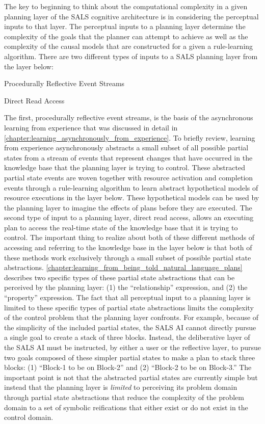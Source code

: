 The key to beginning to think about the computational complexity in a
given planning layer of the SALS cognitive architecture is in
considering the perceptual inputs to that layer.  The perceptual
inputs to a planning layer determine the complexity of the goals that
the planner can attempt to achieve as well as the complexity of the
causal models that are constructed for a given a rule-learning
algorithm.  There are two different types of inputs to a SALS planning
layer from the layer below:
\begin{packed_enumerate}
\item{Procedurally Reflective Event Streams}
\item{Direct Read Access}
\end{packed_enumerate}
The first, procedurally reflective event streams, is the basis of the
asynchronous learning from experience that was discussed in detail in
{\mbox{\autoref{chapter:learning_asynchronously_from_experience}}}.
To briefly review, learning from experience asynchronously abstracts a
small subset of all possible partial states from a stream of events
that represent changes that have occurred in the knowledge base that
the planning layer is trying to control.  These abstracted partial
state events are woven together with resource activation and
completion events through a rule-learning algorithm to learn abstract
hypothetical models of resource executions in the layer below.  These
hypothetical models can be used by the planning layer to imagine the
effects of plans before they are executed.  The second type of input
to a planning layer, direct read access, allows an executing plan to
access the real-time state of the knowledge base that it is trying to
control.  The important thing to realize about both of these different
methods of accessing and referring to the knowledge base in the layer
below is that both of these methods work exclusively through a small
subset of possible partial state abstractions.
{\mbox{\autoref{chapter:learning_from_being_told_natural_language_plans}}}
describes two specific types of these partial state abstractions that
can be perceived by the planning layer: (1) the ``relationship''
expression, and (2) the ``property'' expression.  The fact that all
perceptual input to a planning layer is limited to these specific
types of partial state abstractions limits the complexity of the
control problem that the planning layer confronts.  For example,
because of the simplicity of the included partial states, the SALS AI
cannot directly pursue a single goal to create a stack of three
blocks.  Instead, the deliberative layer of the SALS AI must be
instructed, by either a user or the reflective layer, to pursue two
goals composed of these simpler partial states to make a plan to stack
three blocks: (1) ``Block-1 to be on Block-2'' and (2) ``Block-2 to be
on Block-3.''  The important point is not that the abstracted partial
states are currently simple but instead that the planning layer is
\emph{limited} to perceiving its problem domain through partial state
abstractions that reduce the complexity of the problem domain to a set
of symbolic reifications that either exist or do not exist in the
control domain.

